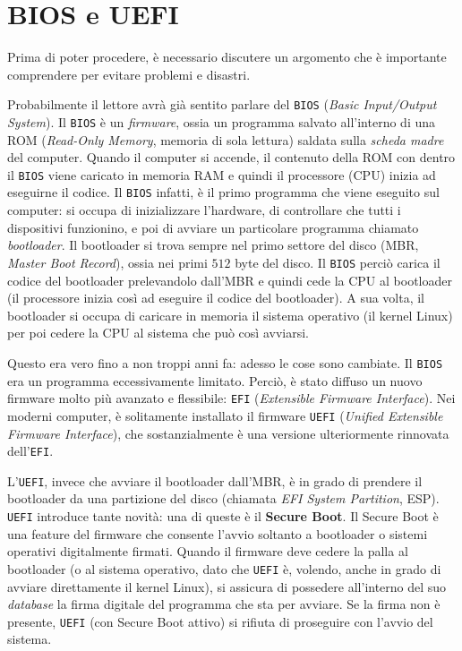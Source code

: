 \section{BIOS e UEFI}\label{sec:bios-uefi}
Prima di poter procedere, è necessario discutere un argomento che è importante comprendere per evitare problemi e disastri.

Probabilmente il lettore avrà già sentito parlare del \texttt{BIOS} (\textit{Basic Input/Output System}). Il \texttt{BIOS} è un \textit{firmware}, ossia un programma salvato all'interno di una ROM (\textit{Read-Only Memory}, memoria di sola lettura) saldata sulla \textit{scheda madre} del computer. Quando il computer si accende, il contenuto della ROM con dentro il \texttt{BIOS} viene caricato in memoria RAM e quindi il processore (CPU) inizia ad eseguirne il codice. Il \texttt{BIOS} infatti, è il primo programma che viene eseguito sul computer: si occupa di inizializzare l'hardware, di controllare che tutti i dispositivi funzionino, e poi di avviare un particolare programma chiamato \textit{bootloader}. Il bootloader si trova sempre nel primo settore del disco (MBR, \textit{Master Boot Record}), ossia nei primi \(512\) byte del disco. Il \texttt{BIOS} perciò carica il codice del bootloader prelevandolo dall'MBR e quindi cede la CPU al bootloader (il processore inizia così ad eseguire il codice del bootloader). A sua volta, il bootloader si occupa di caricare in memoria il sistema operativo (il kernel Linux) per poi cedere la CPU al sistema che può così avviarsi.

Questo era vero fino a non troppi anni fa: adesso le cose sono cambiate. Il \texttt{BIOS} era un programma eccessivamente limitato. Perciò, è stato diffuso un nuovo firmware molto più avanzato e flessibile: \texttt{EFI} (\textit{Extensible Firmware Interface}). Nei moderni computer, è solitamente installato il firmware \texttt{UEFI} (\textit{Unified Extensible Firmware Interface}), che sostanzialmente è una versione ulteriormente rinnovata dell'\texttt{EFI}.

L'\texttt{UEFI}, invece che avviare il bootloader dall'MBR, è in grado di prendere il bootloader da una partizione del disco (chiamata \textit{EFI System Partition}, ESP). \texttt{UEFI} introduce tante novità: una di queste è il \textbf{Secure Boot}. Il Secure Boot è una feature del firmware che consente l'avvio soltanto a bootloader o sistemi operativi digitalmente firmati. Quando il firmware deve cedere la palla al bootloader (o al sistema operativo, dato che \texttt{UEFI} è, volendo, anche in grado di avviare direttamente il kernel Linux), si assicura di possedere all'interno del suo \textit{database} la firma digitale del programma che sta per avviare. Se la firma non è presente, \texttt{UEFI} (con Secure Boot attivo) si rifiuta di proseguire con l'avvio del sistema.

